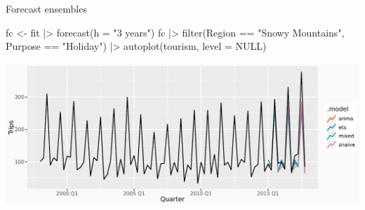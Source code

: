 \documentclass[
  14pt,
  ignorenonframetext,
  aspectratio=169,
]{beamer}
\newenvironment{Shaded}{\begin{snugshade}}{\end{snugshade}}
\newcommand{\AttributeTok}[1]{\textcolor[rgb]{0.77,0.63,0.00}{#1}}
\newcommand{\ConstantTok}[1]{\textcolor[rgb]{0.00,0.00,0.00}{#1}}
\newcommand{\FunctionTok}[1]{\textcolor[rgb]{0.00,0.00,0.00}{#1}}
\newcommand{\NormalTok}[1]{\textcolor[rgb]{0.00,0.00,0.00}{#1}}
\newcommand{\OtherTok}[1]{\textcolor[rgb]{0.56,0.35,0.01}{#1}}
\newcommand{\SpecialCharTok}[1]{\textcolor[rgb]{0.00,0.00,0.00}{#1}}
\newcommand{\StringTok}[1]{\textcolor[rgb]{0.31,0.60,0.02}{#1}}
\renewenvironment{Shaded}{\vspace*{0.15cm}\color{black}\fontsize{10}{10}\sf\begin{snugshade}\color{black}}{\end{snugshade}}
\begin{document}
\begin{frame}[fragile]{Forecast ensembles}
\protect\hypertarget{forecast-ensembles-2}{}
\fontsize{10}{11}\sf

\begin{Shaded}
\begin{Highlighting}[]
\NormalTok{fc }\OtherTok{\textless{}{-}}\NormalTok{ fit }\SpecialCharTok{|\textgreater{}} \FunctionTok{forecast}\NormalTok{(}\AttributeTok{h =} \StringTok{"3 years"}\NormalTok{)}
\NormalTok{fc }\SpecialCharTok{|\textgreater{}}
  \FunctionTok{filter}\NormalTok{(Region }\SpecialCharTok{==} \StringTok{"Snowy Mountains"}\NormalTok{, Purpose }\SpecialCharTok{==} \StringTok{"Holiday"}\NormalTok{) }\SpecialCharTok{|\textgreater{}}
  \FunctionTok{autoplot}\NormalTok{(tourism, }\AttributeTok{level =} \ConstantTok{NULL}\NormalTok{)}
\end{Highlighting}
\end{Shaded}

\includegraphics{04_arima_files/figure-beamer/trainfc-1.pdf}
\end{frame}
\end{document}
